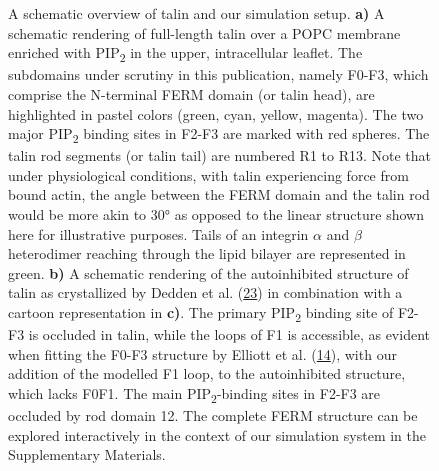 \documentclass[
  twocolumn]{biophys-new-mod}
\begin{document}
\begin{figure}
\begin{minipage}[t]{0.50\linewidth}
{\centering 


}

\subcaption{\label{fig-tln-align-autoinhib}~}
\end{minipage}%

\caption{\label{fig-structure}A schematic overview of talin and our
simulation setup. \textbf{a)} A schematic rendering of full-length talin
over a POPC membrane enriched with PIP\textsubscript{2} in the upper,
intracellular leaflet. The subdomains under scrutiny in this
publication, namely F0-F3, which comprise the N-terminal FERM domain (or
talin head), are highlighted in pastel colors (green, cyan, yellow,
magenta). The two major PIP\textsubscript{2} binding sites in F2-F3 are
marked with red spheres. The talin rod segments (or talin tail) are
numbered R1 to R13. Note that under physiological conditions, with talin
experiencing force from bound actin, the angle between the FERM domain
and the talin rod would be more akin to 30° as opposed to the linear
structure shown here for illustrative purposes. Tails of an integrin
\(\alpha\) and \(\beta\) heterodimer reaching through the lipid bilayer
are represented in green. \textbf{b)} A schematic rendering of the
autoinhibited structure of talin as crystallized by Dedden et al.
(\protect\hyperlink{ref-deddenArchitectureTalin1Reveals2019a}{23}) in
combination with a cartoon representation in \textbf{c)}. The primary
PIP\textsubscript{2} binding site of F2-F3 is occluded in talin, while
the loops of F1 is accessible, as evident when fitting the F0-F3
structure by Elliott et al.
(\protect\hyperlink{ref-elliottStructureTalinHead2010}{14}), with our
addition of the modelled F1 loop, to the autoinhibited structure, which
lacks F0F1. The main PIP\textsubscript{2}-binding sites in F2-F3 are
occluded by rod domain 12. The complete FERM structure can be explored
interactively in the context of our simulation system in the
Supplementary Materials.}

\end{figure}
\end{document}
